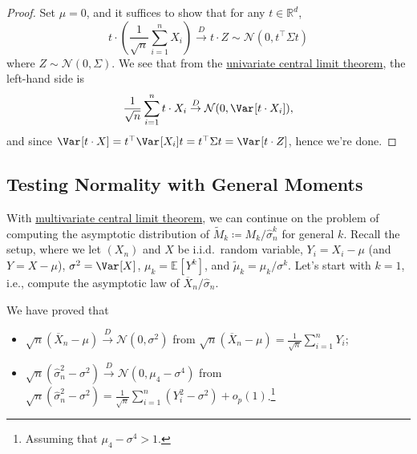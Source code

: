 \begin{proof}
	Set \(\mu = 0\), and it suffices to show that for any \(t \in \mathbb{R} ^d\),
	\[
		t \cdot \left( \frac{1}{\sqrt{n} } \sum_{i=1}^{n} X_i \right)
		\overset{D}{\to} t \cdot Z
		\sim \mathcal{N} (0, t ^{\top} \Sigma t)
	\]
	where \(Z \sim \mathcal{N} (0, \Sigma )\). We see that from the \hyperref[thm:CLT]{univariate central limit theorem}, the left-hand side is
	\[
		\frac{1}{\sqrt{n} } \sum_{i=1}^{n} t \cdot X_i
		\overset{D}{\to} \mathcal{N} (0, \Var_{}[t\cdot X_i] ),
	\]
	and since \(\Var_{}[t \cdot X] = t^{\top} \Var_{}[X_i] t = t ^{\top} \Sigma t = \Var_{}[t \cdot Z] \), hence we're done.
\end{proof}

\subsection{Testing Normality with General Moments}
With \hyperref[thm:multivariate-CLT]{multivariate central limit theorem}, we can continue on the problem of computing the asymptotic distribution of \(\widetilde{M} _k \coloneqq M_k / \hat{\sigma} _n^k\) for general \(k\). Recall the setup, where we let \((X_n)\) and \(X\) be i.i.d.\ random variable, \(Y_i = X_i - \mu \) (and \(Y = X - \mu \)), \(\sigma ^2 = \Var_{}[X] \), \(\mu _k = \mathbb{E}_{}[Y^k] \), and \(\widetilde{\mu} _k = \mu _k / \sigma ^k\). Let's start with \(k = 1\), i.e., compute the asymptotic law of \(\overline{X} _n / \hat{\sigma} _n\).

\begin{prev}
	We have proved that
	\begin{itemize}
		\item \(\sqrt{n} (\overline{X} _n - \mu ) \overset{D}{\to} \mathcal{N} (0, \sigma ^2)\) from \(\sqrt{n} (\overline{X} _n - \mu ) = \frac{1}{\sqrt{n} } \sum_{i=1}^{n} Y_i\);
		\item \(\sqrt{n} (\hat{\sigma} _n^2 - \sigma ^2) \overset{D}{\to} \mathcal{N} (0, \mu _4 - \sigma ^4) \) from \(\sqrt{n} (\hat{\sigma} _n^2 - \sigma ^2) = \frac{1}{\sqrt{n} } \sum_{i=1}^{n} (Y_i^2 - \sigma ^2) + o_p(1)\).\footnote{Assuming that \(\mu _4 - \sigma ^4 > 1\).}
	\end{itemize}
\end{prev}

